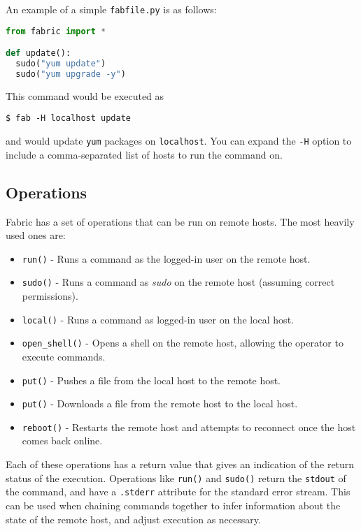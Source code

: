 \documentclass[9pt,twocolumn,twoside]{idsi}
\begin{document}
An example of a simple \texttt{fabfile.py} is as follows:

\begin{lstlisting}[language=Python, showstringspaces=false]
from fabric import *

def update():
  sudo("yum update")
  sudo("yum upgrade -y")
\end{lstlisting}

This command would be executed as
\begin{verbatim}
$ fab -H localhost update
\end{verbatim}
and would update \texttt{yum} packages on \texttt{localhost}. You can expand the \texttt{-H} option to include a comma-separated list of hosts to run the command on.

\subsection{Operations}

Fabric has a set of operations that can be run on remote hosts. The most heavily used ones are:
\begin{itemize}
  \item \texttt{run()} - Runs a command as the logged-in user on the remote host.
  \item \texttt{sudo()} - Runs a command as \emph{sudo} on the remote host (assuming correct permissions).
  \item \texttt{local()} - Runs a command as logged-in user on the local host.
  \item \texttt{open\_shell()} - Opens a shell on the remote host, allowing the operator to execute commands.
  \item \texttt{put()} - Pushes a file from the local host to the remote host.
  \item \texttt{put()} - Downloads a file from the remote host to the local host.
  \item \texttt{reboot()} - Restarts the remote host and attempts to reconnect once the host comes back online.
\end{itemize}

Each of these operations has a return value that gives an indication of the return status of the execution. Operations like \texttt{run()} and \texttt{sudo()} return the \texttt{stdout} of the command, and have a \texttt{.stderr} attribute for the standard error stream. This can be used when chaining commands together to infer information about the state of the remote host, and adjust execution as necessary.
\end{document}
